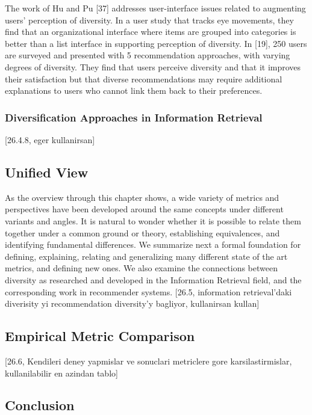 The work of Hu and Pu [37] addresses user-interface issues related to augmenting users’ perception of diversity. In a user study that tracks eye movements, they find that an organizational interface where items are grouped into categories is better than a list interface in supporting perception of diversity. In [19], 250 users are surveyed and presented with 5 recommendation approaches, with varying degrees of diversity. They find that users perceive diversity and that it improves their satisfaction but that diverse recommendations may require additional explanations to users who cannot link them back to their preferences.

\subsubsection{Diversification Approaches in Information Retrieval}

[26.4.8, eger kullanirsan]

\subsection{Unified View}

As the overview through this chapter shows, a wide variety of metrics and perspectives have been developed around the same concepts under different variants and angles. It is natural to wonder whether it is possible to relate them together under a common ground or theory, establishing equivalences, and identifying fundamental differences. We summarize next a formal foundation for defining, explaining, relating and generalizing many different state of the art metrics, and defining new ones. We also examine the connections between diversity as researched and developed in the Information Retrieval field, and the corresponding work in recommender systems.
[26.5, information retrieval'daki diverisity yi recommendation diversity'y bagliyor, kullanirsan kullan]

\subsection{Empirical Metric Comparison}
[26.6, Kendileri deney yapmislar ve sonuclari metriclere gore karsilastirmislar, kullanilabilir en azindan tablo]

\subsection{Conclusion}

